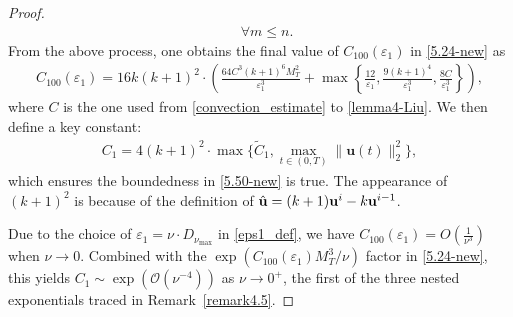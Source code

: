 \documentclass{article}
\theoremstyle{definition}                   %
\begin{document}
\begin{proof}
\begin{align}
\quad \forall m\le n.
\label{5.25-new}
\end{align}
%
From the above process, one obtains the final value of $C_{100}(\varepsilon_1)$ in \eqref{5.24-new} as 
\begin{align}
C_{100}(\varepsilon_1) = 16k(k+1)^2 \cdot \left( 
  \frac{64C^3(k+1)^6 M_T^2}{\varepsilon_1^3} 
+ \max\left\{ \frac{12}{\varepsilon_1}, 
\frac{9(k+1)^4}{\varepsilon_1^3}, \frac{8C}{\varepsilon_1^3}  \right\}
   \right),
   \label{def_Ceps}
\end{align}
where $C$ is the one used from \eqref{convection_estimate} to \eqref{lemma4-Liu}.
%
We then define a key constant:
\begin{align}
C_1 = 4(k+1)^2 \cdot  \max \{\tilde{C}_1,
 \max\limits_{t \in (0,T)} \|\mathbf{u}(t)\|_2^2 \},
\label{def_C1}
\end{align}
which ensures the boundedness in \eqref{5.50-new} is true. The appearance of $(k+1)^2$ is because of the definition of $\hat{\bf u}=(k+1){\bf u}^i -k {\bf u}^{i-1}$.

Due to the choice of $\varepsilon_1=\nu\cdot D_{\nu_{\max}}$ in \eqref{eps1_def}, we have $C_{100}(\varepsilon_1) = O(\frac{1}{\nu^3})$ when $\nu\to 0$.
Combined with the $\exp(C_{100}(\varepsilon_1) M_T^3/\nu)$ factor in \eqref{5.24-new}, this yields $C_1\sim \exp(\mathcal{O}(\nu^{-4}))$ as $\nu\to 0^+$, the first of the three nested exponentials traced in Remark~\ref{remark4.5}.


\vskip 0.2cm


\end{proof}
\end{document}

